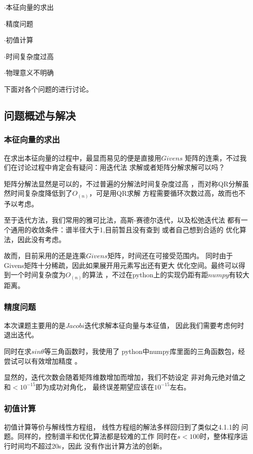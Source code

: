\documentclass[11pt, a4paper, oneside]{ctexart}
\begin{document}
{{{{    $\cdot$本征向量的求出

    $\cdot$精度问题

    $\cdot$初值计算
    
    $\cdot$时间复杂度过高

    $\cdot$物理意义不明确
    
    下面对各个问题的进行讨论。
}
\subsection{问题概述与解决}
\subsubsection{本征向量的求出}
在求出本征向量的过程中，最显而易见的便是直接用$Givens$
矩阵的连乘，不过我们在讨论过程中肯定会有疑问：用迭代法
求解或者矩阵分解求解可以吗？

矩阵分解法显然是可以的，不过普遍的分解法时间复杂度过高
，而对称QR分解虽然时间复杂度降低到了$O_{(n)}$\cite{a}，可是用QR求解
方程需要循环次数过高，故而也不予以考虑。

至于迭代方法，我们常用的雅可比法，高斯-赛德尔迭代，以及松弛迭代法
都有一个通用的收敛条件：谱半径大于1,目前暂且没有查到
或者自己想到合适的
优化算法，因此没有考虑。

故而，目前采用的还是连乘$Givens$矩阵，时间还在可接受范围内。
同时由于Givens矩阵十分稀疏，因此如果展开用元素写出还有更大
优化空间。最终可以得到一个时间复杂度为$O_{(n)}$的算法
，不过在python上的实现仍距有距$numpy$有较大距离。
\subsubsection{精度问题}
本次课题主要用的是$Jacobi$迭代求解本征向量与本征值，
因此我们需要考虑何时退出迭代。

同时在求$sin\theta$等三角函数时，我使用了
python中numpy库里面的三角函数包，经尝试可以有效增加精度
。

显然的，迭代次数会随着矩阵维数增加而增加，我们不妨设定
非对角元绝对值之和$<10^{-15}$即为成功对角化，
最终误差期望应该在$10^{-15}$左右。

\subsubsection{初值计算}
初值计算等价与解线性方程组，
线性方程组的解法多样回归到了类似之4.1.1的
问题。同样的，控制谱半和优化算法都是较难的工作
同时在$s<100$时，整体程序运行时间均不超过20s，因此
没有作出计算方法的创新。


}}}
\end{document}
